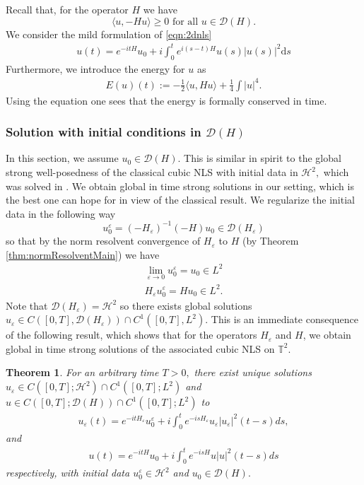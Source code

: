 \documentclass[11pt, oneside]{article}   	%
\newtheorem{theorem}{Theorem}[section]
\newcommand{\ssp}{\mathscr{H}}
\begin{document}
  Recall that, for the operator $H$ we have
\[
\langle u,-H u\rangle\ge 0 \text{ for all }u\in\mathscr{D}(H).
\]
We consider the mild formulation of \eqref{eqn:2dnls}
\begin{align}
u(t)=e^{-i t H}u_0+i \int_{0}^{t}e^{i(s-t)H}u(s)|u(s)|^2\mathrm{d}s\label{eqn:mildnls}
\end{align}
Furthermore, we introduce the energy for $u$ as
\begin{align}
E(u)(t):=-\frac{1}{2}\langle u,H u\rangle+\frac{1}{4}\int|u|^4.
\end{align} 
Using the equation one sees that the energy is formally conserved in time.
%
\subsubsection{Solution with initial conditions in $\mathscr{D}(H)$} \label{subsection:5.4}
%
In this section, we  assume  $u_0 \in \mathscr{D} (H)$. This is similar in spirit to the global strong  well-posedness of the classical cubic NLS with initial data in $\ssp^2,$ which was solved in \cite{brga80}. We obtain global in time strong solutions in our setting, which is the best one can hope for in view of the classical result.
We regularize the initial data in the following way \[u^{\varepsilon}_0 =
(-H_{\varepsilon})^{- 1} (-H) u_0 \in  \mathscr{D}  (H_{\varepsilon})\]
 so that by
the norm resolvent convergence of $H_{\varepsilon}$ to $H$
(by Theorem \ref{thm:normResolventMain}) we have
\begin{align*}
\lim\limits_{\varepsilon\to 0}  u_0^{\varepsilon} = u_0  \in L^2 \\ H_{\varepsilon} u_0^{\varepsilon} = H u_0\in L^2.
\end{align*} 
Note that $ \mathscr{D}  (H_{\varepsilon}) = \ssp^2$ so there exists global solutions
$u_{\varepsilon} \in C ([0, T],  \mathscr{D}  (H_{\varepsilon})) \cap C^1 ([0, T], L^2).$
This is an immediate consequence of the following result, which shows that for the operators $H_\varepsilon$ and $H$, we obtain global in time strong solutions of the associated cubic NLS on $\mathbb{T}^2$. 

\begin{theorem}\label{thm:2dnlsfix}
	For an arbitrary time $T>0,$ there exist unique solutions $u_\varepsilon\in C([0,T];\ssp^2)\cap C^1([0,T];L^2)$ and $u\in C([0,T];\mathscr{D}(H))\cap C^1([0,T];L^2)$ to
	\begin{align}
	u_\varepsilon(t) = e^{- i t H_\varepsilon} u^\varepsilon_0 + i\int_{0}^{t} e^{- i s H_\varepsilon} u_\varepsilon | u_\varepsilon
	|^2 (t - s) d s, \end{align}
	and
	\begin{align}
	u (t) = e^{- i t H} u_0 + i\int_{0}^{t} e^{- i s H} u | u
	|^2 (t - s) d s \end{align}
	respectively, with  initial data  $u^\varepsilon_0\in \ssp^2$ and $u_0\in \mathscr{D}(H).$
\end{theorem}
\end{document}
